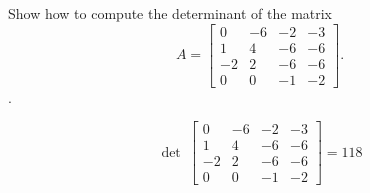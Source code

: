 
\begin{exerciseStatement}


Show how to compute the determinant of the matrix \[A= \left[\begin{array}{cccc}
0 & -6 & -2 & -3 \\
1 & 4 & -6 & -6 \\
-2 & 2 & -6 & -6 \\
0 & 0 & -1 & -2
\end{array}\right] .\].


\end{exerciseStatement}
    
\begin{exerciseAnswer} 
\[\operatorname{det}\  \left[\begin{array}{cccc}
0 & -6 & -2 & -3 \\
1 & 4 & -6 & -6 \\
-2 & 2 & -6 & -6 \\
0 & 0 & -1 & -2
\end{array}\right] = 118 \]
\end{exerciseAnswer}
    
